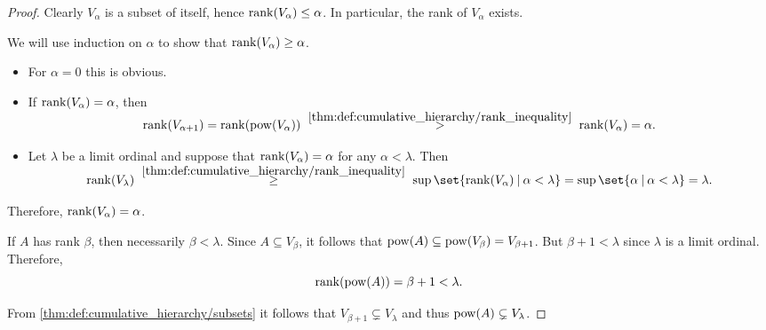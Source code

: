 \begin{proof}
   Clearly \( V_\alpha \) is a subset of itself, hence \( \operatorname{rank}(V_\alpha) \leq \alpha \). In particular, the rank of \( V_\alpha \) exists.

  We will use induction on \( \alpha \) to show that \( \operatorname{rank}(V_\alpha) \geq \alpha \).
  \begin{itemize}
    \item For \( \alpha = 0 \) this is obvious.
    \item If \( \operatorname{rank}(V_\alpha) = \alpha \), then
    \begin{equation*}
      \rank(V_{\alpha + 1})
      =
      \rank(\pow(V_\alpha))
      \reloset {\ref{thm:def:cumulative_hierarchy/rank_inequality}} >
      \rank(V_\alpha)
      =
      \alpha.
    \end{equation*}

    \item Let \( \lambda \) be a limit ordinal and suppose that \( \operatorname{rank}(V_\alpha) = \alpha \) for any \( \alpha < \lambda \). Then
    \begin{equation*}
      \rank(V_\lambda)
      \reloset {\ref{thm:def:cumulative_hierarchy/rank_inequality}} \geq
      \sup\set{ \rank(V_\alpha) \given \alpha < \lambda }
      =
      \sup\set{ \alpha \given \alpha < \lambda }
      =
      \lambda.
    \end{equation*}
  \end{itemize}

  Therefore, \( \operatorname{rank}(V_\alpha) = \alpha \).

   If \( A \) has rank \( \beta \), then necessarily \( \beta < \lambda \). Since \( A \subseteq V_\beta \), it follows that \( \operatorname{pow}(A) \subseteq \operatorname{pow}(V_\beta) = V_{\beta + 1} \). But \( \beta + 1 < \lambda \) since \( \lambda \) is a limit ordinal. Therefore,
  \begin{equation*}
    \operatorname{rank}(\operatorname{pow}(A)) = \beta + 1 < \lambda.
  \end{equation*}

  From \cref{thm:def:cumulative_hierarchy/subsets} it follows that \( V_{\beta + 1} \subsetneq V_\lambda \) and thus \( \operatorname{pow}(A) \subsetneq V_\lambda \).
\end{proof}

